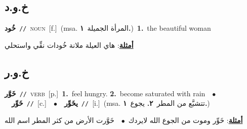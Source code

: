 \documentclass[10pt,a4paper,twoside]{article} %
\begin{document}
\begin{multicols}{2}
\vspace{-3mm}
\subsection*{\color{blue}\foreignlanguage{arabic}{خ.و.د}\color{blue}{}} 

{\setlength\topsep{0pt}\textbf{\foreignlanguage{arabic}{خُود}}\ {\color{gray}\texttt{//}\color{black}}\ \textsc{noun}\ [f.]\ \color{gray}(msa. \foreignlanguage{arabic}{المرأة الجميلة}~\foreignlanguage{arabic}{\textbf{١.}})\color{black}\ \textbf{1.}~the beautiful woman\  \begin{flushright}\color{gray}\foreignlanguage{arabic}{\textbf{\underline{\foreignlanguage{arabic}{أمثلة}}}: هاي العيلة ملانة خُودات نقِّي واستحلي}\end{flushright}\color{black}} \vspace{2mm}

\vspace{-3mm}
\subsection*{\color{blue}\foreignlanguage{arabic}{خ.و.ر}\color{blue}{}} 

{\setlength\topsep{0pt}\textbf{\foreignlanguage{arabic}{خَوَّر}}\ {\color{gray}\texttt{//}\color{black}}\ \textsc{verb}\ [p.]\ \textbf{1.}~feel hungry.  \textbf{2.}~become saturated with rain\ \ $\bullet$\ \ \setlength\topsep{0pt}\textbf{\foreignlanguage{arabic}{خَوِّر}}\ {\color{gray}\texttt{//}\color{black}}\ [c.]\ \ $\bullet$\ \ \setlength\topsep{0pt}\textbf{\foreignlanguage{arabic}{يخَوِّر}}\ {\color{gray}\texttt{//}\color{black}}\ [i.]\ \color{gray}(msa. \foreignlanguage{arabic}{تتشبَّع من المطر}~\foreignlanguage{arabic}{\textbf{٢.}}  \foreignlanguage{arabic}{يجوع}~\foreignlanguage{arabic}{\textbf{١.}})\color{black}\  \begin{flushright}\color{gray}\foreignlanguage{arabic}{\textbf{\underline{\foreignlanguage{arabic}{أمثلة}}}: خَوِّر وموت من الجوع الله لايردك\ $\bullet$\ \  خَوَّرت الأرض من كثر المطر اسم الله}\end{flushright}\color{black}} \vspace{2mm}


\end{multicols}
\end{document}

